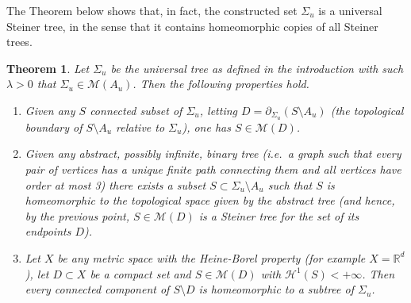\documentclass{amsart}
\newcommand{\RR}{\mathbb R}
\renewcommand{\H}{\mathcal H}
\newcommand{\M}{\mathcal{M}}
\renewcommand{\H}{\mathcal{H}}
\newtheorem{theorem}{Theorem}[section]
\theoremstyle{definition}
\theoremstyle{remark}
\begin{document}
The Theorem below shows that, in fact, the constructed set 
$\Sigma_u$ is a universal Steiner tree, 
in the sense that it contains homeomorphic copies of all 
Steiner trees.

\begin{theorem}
\label{th:universality}%
Let $\Sigma_u$ be the universal tree as defined in the introduction
with such $\lambda>0$ that $\Sigma_u\in \M(A_u)$.
Then the following properties hold.
\begin{enumerate}
  \item[(i)]
Given any $S$ connected subset of $\Sigma_u$, 
letting $D=\partial_{\Sigma_u}(S\setminus A_u)$ (the topological boundary of $S\setminus A_u$ relative 
to $\Sigma_u$),
one has $S\in \M(D)$.
  \item[(ii)]
Given any abstract, possibly infinite, binary tree (i.e.\ a graph 
such that every pair of vertices has a unique finite path connecting them and all vertices 
have order at most 3) 
there exists a subset $S\subset \Sigma_u\setminus A_u$
such that $S$ is homeomorphic to the topological space given by the abstract tree 
(and hence, by the previous point, $S\in \M(D)$ is a Steiner tree for 
the set of its endpoints $D$).

\item[(iii)] 
  Let $X$ be any metric space with the Heine-Borel property
  (for example $X=\RR^d$), let $D\subset X$ be a compact set 
  and $S\in \M(D)$ with $\H^1(S)<+\infty$.
  Then every connected component of $S\setminus D$ 
  is homeomorphic to a subtree of $\Sigma_u$.
\end{enumerate}
\end{theorem}
\end{document}
